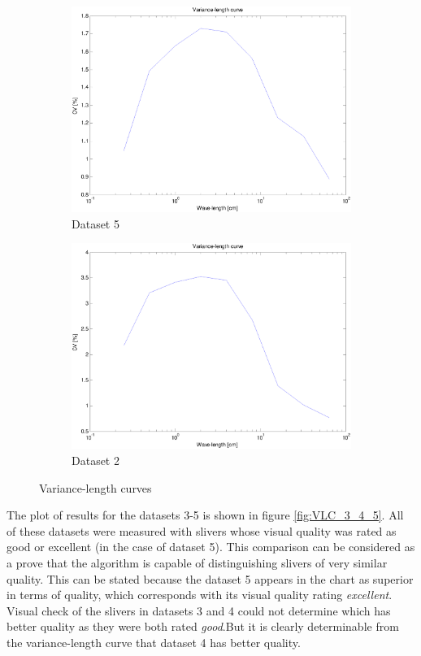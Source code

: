 \documentclass[twoside]{ctuthesis}
\theoremstyle{plain}
\theoremstyle{definition}
\theoremstyle{note}
\begin{document}
\begin{figure}
	\centering
	\begin{subfigure}{0.5\textwidth}
		\centering
		\includegraphics[width=1.0\linewidth]{full_VLC_11.eps}
		\caption{Dataset 5}
		\label{fig:sub_dataset5}
	\end{subfigure}%
	\begin{subfigure}{0.5\textwidth}
		\centering
		\includegraphics[width=1.0\linewidth]{full_VLC_6.eps}
		\caption{Dataset 2}
		\label{fig:sub_dataset2}
	\end{subfigure}
	\caption{Variance-length curves}
	\label{fig:vlc_curves}
\end{figure}

The plot of results for the datasets 3-5 is shown in figure \ref{fig:VLC_3_4_5}. All of these datasets were measured with slivers whose visual quality was rated as good or excellent (in the case of dataset 5). This comparison can be considered as a prove that the algorithm is capable of distinguishing slivers of very similar quality. This can be stated because the dataset 5 appears in the chart as superior in terms of quality, which corresponds with its visual quality rating \textit{excellent}. Visual check of the slivers in datasets 3 and 4 could not determine which has better quality as they were both rated \textit{good}.But it is clearly determinable from the variance-length curve that dataset 4 has better quality.
\end{document}

